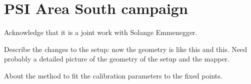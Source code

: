 \section{PSI Area South campaign}

Acknowledge that it is a joint work with Solange Emmenegger.

Describe the changes to the setup: now the geometry is like this and this. Need probably a detailed picture of the geometry of the setup and the mapper.

About the method to fit the calibration parameters to the fixed points.